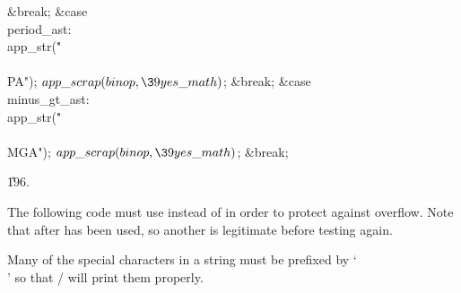 \&{break};\6
\4\&{case} \\{period\_ast}:\5
\\{app\_str}(\.{"\\\\PA"});\5
${}\\{app\_scrap}(\\{binop},\39\\{yes\_math}){}$;\5
\&{break};\6
\4\&{case} \\{minus\_gt\_ast}:\5
\\{app\_str}(\.{"\\\\MGA"});\5
${}\\{app\_scrap}(\\{binop},\39\\{yes\_math}){}$;\5
\&{break};\par
\U196.\fi

The following code must use  instead of  in
order to
protect against overflow. Note that 
after 
has been used, so another  is legitimate before testing again.

Many of the special characters in a string must be prefixed by `\.\\' so that
\TEX/ will print them properly.

